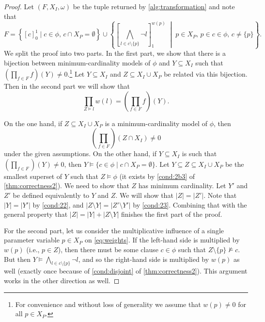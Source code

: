 \begin{proof}
  Let $(F, X_I, \omega)$ be the tuple returned by \cref{alg:transformation} and
  note that
  \[
  F = \left\{ [c]_0^1 \mid c \in \phi \text{, } c \cap X_P = \emptyset \right\} \cup \left\{ \left[ \bigwedge_{l \in c \setminus \{ p \}} \neg l \right]_1^{w(p)} \;\middle|\; p \in X_P \text{, } p \in c \in \phi \text{, } c \ne \{ p \} \right\}.
  \]
  We split the proof into two parts. In the first part, we show that there is a bijection between minimum-cardinality models of $\phi$ and $Y \subseteq X_I$ such that $\left(\prod_{f \in F} f\right)(Y) \ne 0$.\footnote{For convenience and without loss of generality we assume that $w(p) \ne 0$ for all $p \in X_P$.} Let $Y \subseteq X_I$ and $Z \subseteq X_I \cup X_P$ be related via this bijection. Then in the second part we will show that
  \begin{equation} \label{eq:weights}
    \prod_{Z \models l} w(l) = \left(\prod_{f \in F} f\right)(Y).
  \end{equation}

  On the one hand, if $Z \subseteq X_I \cup X_P$ is a minimum-cardinality model
  of $\phi$, then
  \[
    \left(\prod_{f \in F}\right)(Z \cap X_I) \ne 0
  \]
  under the given assumptions. On the other hand, if $Y \subseteq X_I$ is such
  that $\left(\prod_{f \in F}\right)(Y) \ne 0$, then
  $Y \models \{ c \in \phi \mid c \cap X_P = \emptyset \}$. Let
  $Y \subseteq Z \subseteq X_I \cup X_P$ be the smallest superset of $Y$ such
  that $Z \models \phi$ (it exists by \cref{cond:2b3} of
  \cref{thm:correctness2}). We need to show that $Z$ has minimum cardinality.
  Let $Y'$ and $Z'$ be defined equivalently to $Y$ and $Z$. We will show that
  $|Z| = |Z'|$. Note that $|Y| = |Y'|$ by \cref{cond:22}, and
  $|Z \setminus Y| = |Z' \setminus Y'|$ by \cref{cond:23}. Combining that with
  the general property that $|Z| = |Y| + |Z \setminus Y|$ finishes the first
  part of the proof.

  For the second part, let us consider the multiplicative influence of a single
  parameter variable $p \in X_P$ on \cref{eq:weights}. If the left-hand side is
  multiplied by $w(p)$ (i.e., $p \in Z$), then there must be some clause $c \in
  \phi$ such that $Z \setminus \{ p \} \not\models c$. But then $Y \models
  \bigwedge_{l \in c \setminus \{ p \}} \neg l$, and so the right-hand side is
  multiplied by $w(p)$ as well (exactly once because of \cref{cond:disjoint} of
  \cref{thm:correctness2}). This argument works in the other direction as well.
\end{proof}

